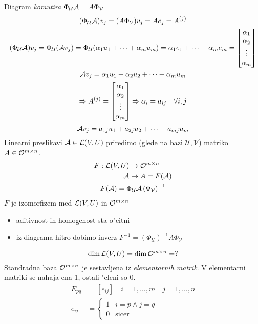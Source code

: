 Diagram \emph{komutira} $\Phi_\mathcal{U}\mathcal{A} = A\Phi_\mathcal{V}$
\begin{gather*}
(\Phi_{\mathcal{U}}\mathcal{A})v_j = (A \Phi_{\mathcal{V}})v_j = Ae_j = A^{(j)} \\
(\Phi_{\mathcal{U}}\mathcal{A})v_j = \Phi_{\mathcal{U}}(\mathcal{A} v_j) = \Phi_{\mathcal{U}} (\alpha_1 u_1 + \cdots + \alpha_m u_m) = \alpha_1 e_1 + \cdots + \alpha_m e_m = \begin{bmatrix}\alpha_1 \\ \alpha_2 \\ \vdots \\ \alpha_m \end{bmatrix} \\
\mathcal{A} v_j = \alpha_1 u_1 + \alpha_2 u_2 + \cdots + \alpha_m u_m \\
\Rightarrow A^{(j)} = \begin{bmatrix}\alpha_1 \\ \alpha_2 \\ \vdots \\ \alpha_m \end{bmatrix} \Rightarrow \alpha_i = a_{ij} \quad \forall i, j
\end{gather*}
\begin{equation*}
\mathcal{A} v_j = a_{1j} u_1 + a_{2j} u_2 + \cdots + a_{mj} u_m
\end{equation*}
Linearni preslikavi $\mathcal{A} \in \mathcal{L}(V, U)$ priredimo (glede na bazi $\mathcal{U}, \mathcal{V}$) matriko $A \in \mathcal{O}^{m \times n}$.
\begin{gather*}
\begin{aligned}
F : \mathcal{L}(V, U) &\to \mathcal{O}^{m \times n} \\
\mathcal{A} &\mapsto A = F(\mathcal{A})
\end{aligned} \\
F(\mathcal{A}) = \Phi_{\mathcal{U}}\mathcal{A}\left(\Phi_{\mathcal{V}}\right)^{-1}
\end{gather*}
$F$ je izomorfizem med $\mathcal{L}(V, U)$ in $\mathcal{O}^{m \times n}$
\begin{itemize}
	\item  aditivnost in homogenost sta o"citni
	\item iz diagrama hitro dobimo inverz $F^{-1} = \left(\Phi_{\mathcal{U}}\right)^{-1}A\Phi_{\mathcal{V}}$
\end{itemize}
\begin{equation*}
\dim \mathcal{L}(V, U) = \dim \mathcal{O}^{m \times n} = ?
\end{equation*}
Standradna baza $\mathcal{O}^{m \times n}$ je sestavljena iz \emph{elementarnih matrik}. V elementarni matriki se nahaja ena 1, ostali "cleni so 0.
\begin{align*}
E_{pq} &= [e_{ij}] \quad i = 1, \ldots, m \quad j = 1, \ldots, n \\
e_{ij}& = \begin{cases}
1 & i = p \land j = q \\
0 & \text{sicer}
\end{cases}
\end{align*}
%
